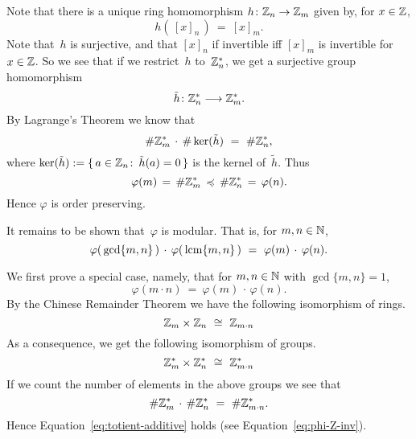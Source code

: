 \documentclass[main.tex]{subfiles}
\begin{document}
\begin{ex}
Note that there is a unique ring homomorphism
$h\colon \mathbb{Z}_{n}\rightarrow \mathbb{Z}_{m}$
given by,
for $x\in \mathbb{Z}$,
\begin{equation*}
h(\,[x]_n\,) \ =\ [x]_m.
\end{equation*}
Note that~$h$ is surjective,
and that $[x]_n$ if invertible iff $[x]_m$ is invertible
for $x\in \mathbb{Z}$.
So we see that if we restrict~$h$ to~$\mathbb{Z}_{n}^*$,
we get a surjective group homomorphism
\begin{equation*}
\tilde{h}\colon \mathbb{Z}_{n}^* \longrightarrow \mathbb{Z}_{m}^*.
\end{equation*}
By Lagrange's Theorem we know that
\begin{equation*}
\# \mathbb{Z}_{m}^*  \,\cdot\, \# \ker(\tilde h) \ =\ \# \mathbb{Z}_{n}^*,
\end{equation*}
where $\ker(\tilde{h}) 
:=\smash{\{\, a\in \mathbb{Z}_{n} \colon \,\tilde{h}(a)=0\,\}}$
is the kernel of~$\tilde{h}$.
Thus
\begin{equation*}
\varphi(m) \,=\,
\# \mathbb{Z}_{m}^*  \,\preccurlyeq\,
 \# \mathbb{Z}_{n}^*
\,=\,\varphi(n).
\end{equation*}
Hence $\varphi$ is order preserving.

It remains to be shown that~$\varphi$
is modular. That is,
for $m,n\in\mathbb{N}$,
\begin{equation}
\label{eq:totient-modular}
\varphi(\,\gcd\{m,n\}\,) \,\cdot\, \varphi(\,\lcm\{m,n\}\,)
\ =\ 
\varphi(m) \,\cdot\,\varphi(n).
\end{equation}

We first prove a special case,
namely,
that for $m,n\in\mathbb{N}$ with $\gcd\{m,n\}=1$,
\begin{equation}
\label{eq:totient-additive}
\varphi(m\cdot n) \ =\ \varphi(m)\,\cdot\,\varphi(n).
\end{equation}
By the Chinese Remainder Theorem we 
have the following isomorphism of rings.
\begin{equation*}
\Zmod{m} \times \Zmod{n} \ \cong\ \Zmod{m\cdot n}
\end{equation*}
As a consequence, we get the following
isomorphism of groups.
\begin{equation*}
\mathbb{Z}_{m}^* \times \mathbb{Z}_{n}^* \ \cong\ \mathbb{Z}_{m\cdot n}^*
\end{equation*}
If we count the number of elements in the above
groups we see that
\begin{equation*}
\#\Zmod{m}^* \,\cdot\, \#\Zmod{n}^* \ =\ \#\Zmod{m\cdot n}^*.
\end{equation*}
Hence Equation~\eqref{eq:totient-additive}
holds (see Equation~\eqref{eq:phi-Z-inv}).


\end{ex}
\end{document}
